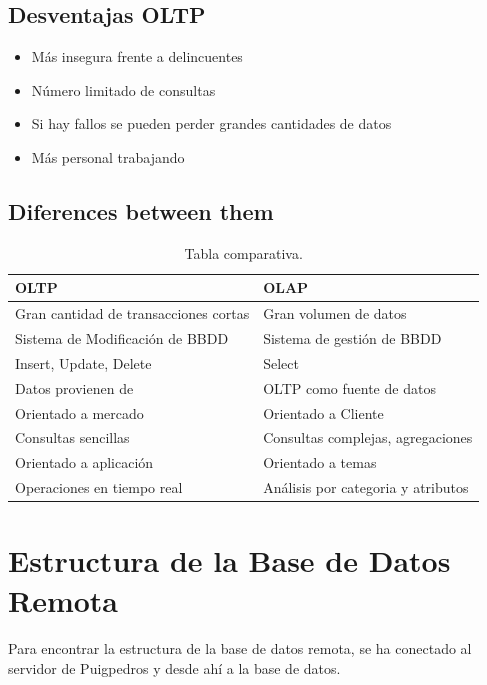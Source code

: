 \documentclass[a4paper 
,twoside
]{article}
\begin{document}
  \subsection{Desventajas OLTP}
  \begin{itemize}
    \item Más insegura frente a delincuentes
    \item Número limitado de consultas
    \item Si hay fallos se pueden perder grandes cantidades de datos
    \item Más personal trabajando
  \end{itemize}

  \subsection{Diferences between them}

  \begin{table}[htbp]
    \begin{center}
    \begin{tabular}{|l|l|}
    \hline
    OLTP & OLAP \\
    \hline \hline
    Gran cantidad de transacciones cortas & Gran volumen de datos \\ \hline
    Sistema de Modificación de BBDD & Sistema de gestión de BBDD \\ \hline
    Insert, Update, Delete & Select \\ \hline
   Datos provienen de  & OLTP como fuente de datos \\ \hline
    Orientado a mercado & Orientado a Cliente \\ \hline
    Consultas sencillas & Consultas complejas, agregaciones \\ \hline
    Orientado a aplicación & Orientado a temas \\ \hline
    Operaciones en tiempo real & Análisis por categoria y atributos \\ \hline
    \end{tabular}
    \caption{Tabla comparativa.}
    \label{tabla:sencilla}
    \end{center}
    \end{table}

\pagebreak
\section{Estructura de la Base de Datos Remota}

  \paragraph{}
  Para encontrar la estructura de la base de datos remota, se ha conectado al servidor de Puigpedros y desde ahí a la base de datos. 
\end{document}
